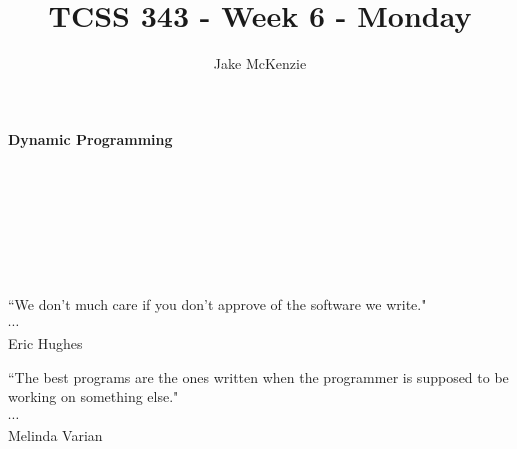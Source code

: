 \documentclass[12pt]{article}
\begin{document}
\title{TCSS 343 - Week 6 - Monday}
\author{Jake McKenzie}
\maketitle
\noindent\centerline{\textbf{Dynamic Programming}}\\\\\\\\\\\\
\begin{center}
    ``We don't much care if you don't approve of the software we write." \\$\cdots$\\ Eric Hughes
\end{center}
\begin{center}
    ``The best programs are the ones written when the programmer is supposed to be working on something else." \\$\cdots$\\ Melinda Varian
\end{center}
\newpage
\end{document}
